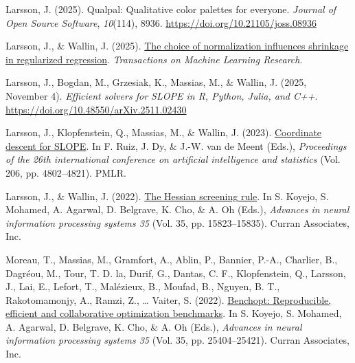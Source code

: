 \documentclass[
  a4paper,
]{article}
\newlength{\cslhangindent}
\newenvironment{CSLReferences}[2] %
 {\begin{list}{}{%
  \setlength{\itemindent}{0pt}
  \setlength{\leftmargin}{0pt}
  \setlength{\parsep}{0pt}
  \ifodd #1
   \setlength{\leftmargin}{\cslhangindent}
   \setlength{\itemindent}{-1\cslhangindent}
  \fi
  \setlength{\itemsep}{#2\baselineskip}}}
 {\end{list}}
\begin{document}
\protect{}\label{refs-articles}
\begin{CSLReferences}{1}{0}
Larsson, J. (2025). Qualpal: Qualitative color palettes for everyone.
\emph{Journal of Open Source Software}, \emph{10}(114), 8936.
\url{https://doi.org/10.21105/joss.08936}

Larsson, J., \& Wallin, J. (2025).
\href{https://openreview.net/forum?id=6xKyDBIwQ5}{The choice of
normalization influences shrinkage in regularized regression}.
\emph{Transactions on Machine Learning Research}.

Larsson, J., Bogdan, M., Grzesiak, K., Massias, M., \& Wallin, J. (2025,
November 4). \emph{Efficient solvers for {SLOPE} in {R}, {Python},
{Julia}, and {C}++}. \url{https://doi.org/10.48550/arXiv.2511.02430}

Larsson, J., Klopfenstein, Q., Massias, M., \& Wallin, J. (2023).
\href{https://proceedings.mlr.press/v206/larsson23a.html}{Coordinate
descent for {SLOPE}}. In F. Ruiz, J. Dy, \& J.-W. van de Meent (Eds.),
\emph{Proceedings of the 26th international conference on artificial
intelligence and statistics} (Vol. 206, pp. 4802--4821). PMLR.

Larsson, J., \& Wallin, J. (2022).
\href{\%0A\%20\%20\%20\%20https://papers.nips.cc/paper/\%5Ffiles/paper/2022/hash/65a925049647eab0aa06a9faf1cd470b-Abstract-Conference.html\%0A\%20\%20}{The
{Hessian} screening rule}. In S. Koyejo, S. Mohamed, A. Agarwal, D.
Belgrave, K. Cho, \& A. Oh (Eds.), \emph{Advances in neural information
processing systems 35} (Vol. 35, pp. 15823--15835). Curran Associates,
Inc.

Moreau, T., Massias, M., Gramfort, A., Ablin, P., Bannier, P.-A.,
Charlier, B., Dagréou, M., Tour, T. D. la, Durif, G., Dantas, C. F.,
Klopfenstein, Q., Larsson, J., Lai, E., Lefort, T., Malézieux, B.,
Moufad, B., Nguyen, B. T., Rakotomamonjy, A., Ramzi, Z., \ldots{}
Vaiter, S. (2022).
\href{\%0A\%20\%20\%20\%20https://proceedings.neurips.cc/paper/\%5Ffiles/paper/2022/hash/a30769d9b62c9b94b72e21e0ca73f338-Abstract-Conference.html\%0A\%20\%20}{Benchopt:
Reproducible, efficient and collaborative optimization benchmarks}. In
S. Koyejo, S. Mohamed, A. Agarwal, D. Belgrave, K. Cho, \& A. Oh (Eds.),
\emph{Advances in neural information processing systems 35} (Vol. 35,
pp. 25404--25421). Curran Associates, Inc.


\end{CSLReferences}
\end{document}
